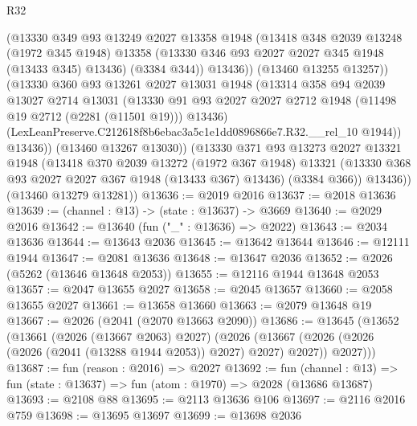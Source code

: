 \begin{lexlean}{R32}
\begin{coremodule}
                (@13330
                  @349
                  @93
                  @13249
                  @2027
                  @13358
                  @1948
                  (@13418
                    @348
                    @2039
                    @13248
                    (@1972 @345 @1948)
                    @13358
                    (@13330 @346 @93 @2027 @2027 @345 @1948 (@13433 @345) @13436)
                    (@3384 @344))
                  @13436))
              (@13460 @13255 @13257))
            (@13330
              @360
              @93
              @13261
              @2027
              @13031
              @1948
              (@13314
                @358
                @94
                @2039
                @13027
                @2714
                @13031
                (@13330
                  @91
                  @93
                  @2027
                  @2027
                  @2712
                  @1948
                  (@11498 @19 @2712 (@2281 (@11501 @19)))
                  @13436)
                (LexLeanPreserve.C212618f8b6ebac3a5c1e1dd0896866e7.R32.__rel_10 @1944))
              @13436))
          (@13460 @13267 @13030))
        (@13330
          @371
          @93
          @13273
          @2027
          @13321
          @1948
          (@13418
            @370
            @2039
            @13272
            (@1972 @367 @1948)
            @13321
            (@13330 @368 @93 @2027 @2027 @367 @1948 (@13433 @367) @13436)
            (@3384 @366))
          @13436))
      (@13460 @13279 @13281))
@13636 := @2019 @2016
@13637 := @2018 @13636
@13639 := (channel : @13) -> (state : @13637) -> @3669
@13640 := @2029 @2016
@13642 := @13640 (fun ("_" : @13636) => @2022)
@13643 := @2034 @13636
@13644 := @13643 @2036
@13645 := @13642 @13644
@13646 := @12111 @1944
@13647 := @2081 @13636
@13648 := @13647 @2036
@13652 := @2026 (@5262 (@13646 @13648 @2053))
@13655 := @12116 @1944 @13648 @2053
@13657 := @2047 @13655 @2027
@13658 := @2045 @13657
@13660 := @2058 @13655 @2027
@13661 := @13658 @13660
@13663 := @2079 @13648 @19
@13667 := @2026 (@2041 (@2070 @13663 @2090))
@13686 := @13645
    (@13652
      (@13661
        (@2026 (@13667 @2063) @2027)
        (@2026
          (@13667 (@2026 (@2026 (@2026 (@2041 (@13288 @1944 @2053)) @2027) @2027) @2027))
          @2027)))
@13687 := fun (reason : @2016) => @2027
@13692 := fun (channel : @13) => fun (state : @13637) => fun (atom : @1970) => @2028 (@13686 @13687)
@13693 := @2108 @88
@13695 := @2113 @13636 @106
@13697 := @2116 @2016 @759
@13698 := @13695 @13697
@13699 := @13698 @2036

\end{coremodule}
\end{lexlean}

